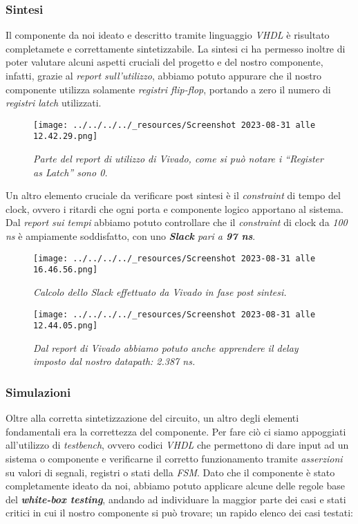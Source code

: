\hypertarget{sintesi}{%
\subsubsection{Sintesi}\label{sintesi}}

Il componente da noi ideato e descritto tramite linguaggio \emph{VHDL} è
risultato completamete e correttamente sintetizzabile. La sintesi ci ha
permesso inoltre di poter valutare alcuni aspetti cruciali del progetto
e del nostro componente, infatti, grazie al \emph{report sull'utilizzo},
abbiamo potuto appurare che il nostro componente utilizza solamente
\emph{registri flip-flop}, portando a zero il numero di \emph{registri
latch} utilizzati.

\begin{figure}
\centering
\texttt{[image: ../../../../\_resources/Screenshot 2023-08-31 alle 12.42.29.png]}
\caption{\emph{Parte del report di utilizzo di Vivado, come si può
notare i ``Register as Latch'' sono 0.}}
\end{figure}

Un altro elemento cruciale da verificare post sintesi è il
\emph{constraint} di tempo del clock, ovvero i ritardi che ogni porta e
componente logico apportano al sistema. Dal \emph{report sui tempi}
abbiamo potuto controllare che il \emph{constraint} di clock da
\emph{100 ns} è ampiamente soddisfatto, con uno \emph{\textbf{Slack}
pari a \textbf{97 ns}}.

\pagebreak

\begin{figure}
\centering
\texttt{[image: ../../../../\_resources/Screenshot 2023-08-31 alle 16.46.56.png]}
\caption{\emph{Calcolo dello Slack effettuato da Vivado in fase post
sintesi.}}
\end{figure}

\begin{figure}
\centering
\texttt{[image: ../../../../\_resources/Screenshot 2023-08-31 alle 12.44.05.png]}
\caption{\emph{Dal report di Vivado abbiamo potuto anche apprendere il
delay imposto dal nostro datapath: 2.387 ns.}}
\end{figure}

\hypertarget{simulazioni}{%
\subsubsection{Simulazioni}\label{simulazioni}}

Oltre alla corretta sintetizzazione del circuito, un altro degli
elementi fondamentali era la correttezza del componente. Per fare ciò ci
siamo appoggiati all'utilizzo di \emph{testbench}, ovvero codici
\emph{VHDL} che permettono di dare input ad un sistema o componente e
verificarne il corretto funzionamento tramite \emph{asserzioni} su
valori di segnali, registri o stati della \emph{FSM}. Dato che il
componente è stato completamente ideato da noi, abbiamo potuto applicare
alcune delle regole base del \textbf{\emph{white-box testing}}, andando
ad individuare la maggior parte dei casi e stati critici in cui il
nostro componente si può trovare; un rapido elenco dei casi testati:

